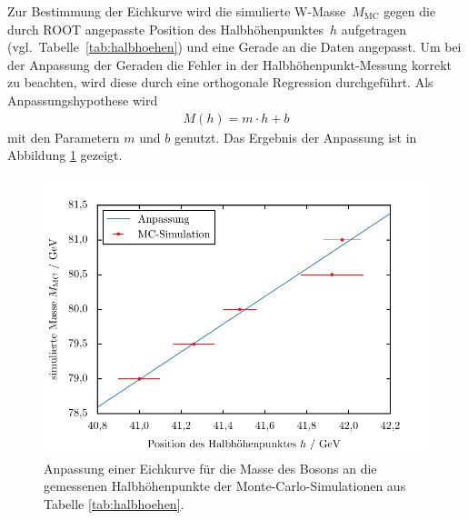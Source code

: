 \documentclass[11pt, a4paper]{article}
\numberwithin{equation}{section}
\begin{document}
Zur Bestimmung der Eichkurve wird die simulierte W-Masse~$M_\mathrm{MC}$ gegen die durch ROOT angepasste Position des Halbhöhenpunktes~$h$ aufgetragen (vgl.\ Tabelle~\ref{tab:halbhoehen}) und eine Gerade an die Daten angepasst.
Um bei der Anpassung der Geraden die Fehler in der Halbhöhenpunkt-Messung korrekt zu beachten, wird diese durch eine orthogonale Regression \cite{odr} durchgeführt.
Als Anpassungshypothese wird
\begin{align*}
	M(h) = m \cdot h + b
\end{align*}
mit den Parametern $m$ und $b$ genutzt.
Das Ergebnis der Anpassung ist in Abbildung \ref{fig:gauge_curve} gezeigt.
\begin{figure}[h]
	\centering
	\includegraphics{./figures/wmass/gauge.pdf}
	\caption{Anpassung einer Eichkurve für die Masse des Bosons an die gemessenen Halbhöhenpunkte der Monte-Carlo-Simulationen aus Tabelle \ref{tab:halbhoehen}.}
	\label{fig:gauge_curve}
\end{figure}
\end{document}
